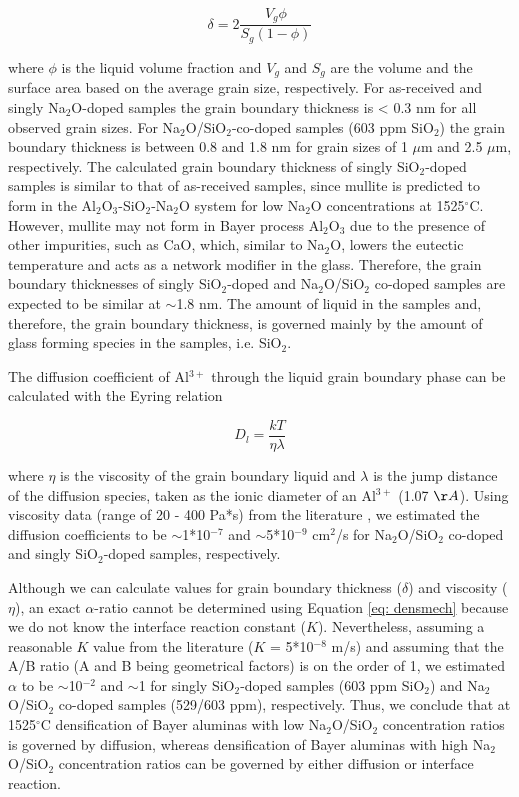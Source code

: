 \begin{equation}
\label{eq: gbthickness}
\delta = 2 \frac{V_{g} \phi}{S_{g} \left(1-\phi\right)}
\end{equation}

\noindent where $\phi$ is the liquid volume fraction and $V_{g}$ and $S_{g}$ are the volume and the surface area based on the average grain size, respectively. For as-received and singly Na$_{2}$O-doped samples the grain boundary thickness is < 0.3 nm for all observed grain sizes. For Na$_{2}$O/SiO$_{2}$-co-doped samples (603 ppm SiO$_{2}$) the grain boundary thickness is between 0.8 and 1.8 nm for grain sizes of 1 $\mu$m and 2.5 $\mu$m, respectively. The calculated grain boundary thickness of singly SiO$_{2}$-doped samples is similar to that of as-received samples, since mullite is predicted to form in the Al$_{2}$O$_{3}$-SiO$_{2}$-Na$_{2}$O system for low Na$_{2}$O concentrations at 1525$^{\circ}$C. However, mullite may not form in Bayer process Al$_{2}$O$_{3}$ due to the presence of other impurities, such as CaO, which, similar to Na$_{2}$O, lowers the eutectic temperature and acts as a network modifier in the glass. Therefore, the grain boundary thicknesses of singly SiO$_{2}$-doped and Na$_{2}$O/SiO$_{2}$ co-doped samples are expected to be similar at $\sim$1.8 nm. The amount of liquid in the samples and, therefore, the grain boundary thickness, is governed mainly by the amount of glass forming species in the samples, i.e. SiO$_{2}$.

The diffusion coefficient of Al$^{3+}$ through the liquid grain boundary phase can be calculated with the Eyring relation

\begin{equation}
\label{eq: eyring}
D_{l} = \frac{kT}{\eta \lambda}
\end{equation}

\noindent where $\eta$ is the viscosity of the grain boundary liquid and $\lambda$ is the jump distance of the diffusion species, taken as the ionic diameter of an Al$^{3+}$ (1.07 $\AA$). Using viscosity data (range of 20 - 400 Pa*s) from the literature \cite{Wu2015}, we estimated the diffusion coefficients to be $\sim$1*10$^{-7}$ and $\sim$5*10$^{-9}$ cm$^{2}$/s for Na$_{2}$O/SiO$_{2}$ co-doped and singly SiO$_{2}$-doped samples, respectively.

Although we can calculate values for grain boundary thickness ($\delta$) and viscosity ($\eta$), an exact $\alpha$-ratio cannot be determined using Equation \ref{eq: densmech} because we do not know the interface reaction constant ($K$). Nevertheless, assuming a reasonable $K$ value from the literature ($K$ = 5*10$^{-8}$ m/s) \cite{Kwon1991} and assuming that the A/B ratio (A and B being geometrical factors) is on the order of 1, we estimated $\alpha$ to be $\sim$10$^{-2}$ and $\sim$1 for singly SiO$_{2}$-doped samples (603 ppm SiO$_{2}$) and Na$_{2}$O/SiO$_{2}$ co-doped samples (529/603 ppm), respectively. Thus, we conclude that at 1525$^{\circ}$C densification of Bayer aluminas with low Na$_{2}$O/SiO$_{2}$ concentration ratios is governed by diffusion, whereas densification of Bayer aluminas with high Na$_{2}$O/SiO$_{2}$ concentration ratios can be governed by either diffusion or interface reaction. 

